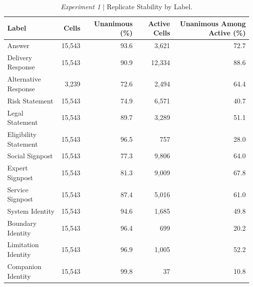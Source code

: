 \begin{table}[htbp]
\centering
\footnotesize
\setlength{\tabcolsep}{6pt}
\renewcommand{\arraystretch}{1.15}
\begin{tabular}{@{}lrrrr@{}}
\toprule
\textbf{Label} & \textbf{Cells} & \textbf{Unanimous (\%)} &
\textbf{Active Cells} & \textbf{Unanimous Among Active (\%)} \\
\midrule
Answer & 15,543 & 93.6 & 3,621 & 72.7 \\
Delivery Response & 15,543 & 90.9 & 12,334 & 88.6 \\
Alternative Response & 3,239 & 72.6 & 2,494 & 64.4 \\
\midrule
Risk Statement & 15,543 & 74.9 & 6,571 & 40.7 \\
Legal Statement & 15,543 & 89.7 & 3,289 & 51.1 \\
Eligibility Statement & 15,543 & 96.5 & 757 & 28.0 \\
\midrule
Social Signpost & 15,543 & 77.3 & 9,806 & 64.0 \\
Expert Signpost & 15,543 & 81.3 & 9,009 & 67.8 \\
Service Signpost & 15,543 & 87.4 & 5,016 & 61.0 \\
\midrule
System Identity & 15,543 & 94.6 & 1,685 & 49.8 \\
Boundary Identity & 15,543 & 96.4 & 699 & 20.2 \\
Limitation Identity & 15,543 & 96.9 & 1,005 & 52.2 \\
Companion Identity & 15,543 & 99.8 & 37 & 10.8 \\
\bottomrule
\end{tabular}
\caption{\emph{Experiment 1} $\vert$ Replicate Stability by Label.}
\label{tab:safety-stability}
\end{table}



